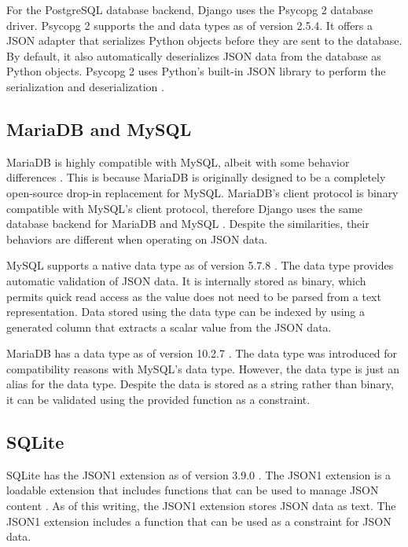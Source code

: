 For the PostgreSQL database backend, Django uses the Psycopg 2 database driver.
Psycopg 2 supports the  and  data types as of version
2.5.4. It offers a JSON adapter that serializes Python objects before they are
sent to the database. By default, it also automatically deserializes JSON data
from the database as Python objects. Psycopg 2 uses Python's built-in JSON
library to perform the serialization and deserialization
\cite{psycopg2:json-adaptation}.

\subsection{MariaDB and MySQL}

MariaDB is highly compatible with MySQL, albeit with some behavior differences
\cite{mariadb:compatibility}. This is because MariaDB is originally designed to
be a completely open-source drop-in replacement for MySQL. MariaDB's client
protocol is binary compatible with MySQL's client protocol, therefore Django
uses the same database backend for MariaDB and MySQL \cite{django:databases}.
Despite the similarities, their behaviors are different when operating on JSON
data.

MySQL supports a native  data type as of version 5.7.8
\cite{mysql:json}. The  data type provides automatic validation of
JSON data. It is internally stored as binary, which permits quick read access
as the value does not need to be parsed from a text representation. Data stored
using the  data type can be indexed by using a generated column that
extracts a scalar value from the JSON data.

MariaDB has a  data type as of version 10.2.7 \cite{mariadb:json}.
The  data type was introduced for compatibility reasons with MySQL's
 data type. However, the  data type is just an alias for
the  data type. Despite the data is stored as a string rather
than binary, it can be validated using the provided  function
as a  constraint.

\subsection{SQLite}

SQLite has the JSON1 extension as of version 3.9.0 \cite{sqlite:3.9.0}. The
JSON1 extension is a loadable extension that includes functions that can be
used to manage JSON content \cite{sqlite:json1}. As of this writing, the JSON1
extension stores JSON data as text. The JSON1 extension includes a
 function that can be used as a  constraint for
JSON data.

